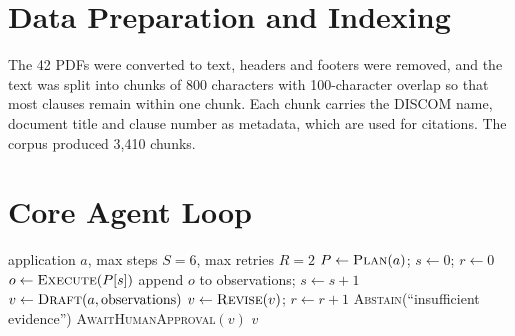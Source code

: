 \documentclass[12pt,a4paper,oneside]{report}
\newif\ifguidance
\newcommand{\guide}[1]{%
  \ifguidance
  \begin{tcolorbox}[enhanced,breakable,colback=guidebg,colframe=bmsblue,
    boxrule=0.6pt,arc=2pt,left=6pt,right=6pt,top=4pt,bottom=4pt,
    fonttitle=\bfseries\small,title={What to write here},
    before upper={\small\setstretch{1.1}}]
  #1
  \end{tcolorbox}
  \fi}
\newcommand{\dodont}[2]{%
  \ifguidance
  \begin{tcolorbox}[enhanced,breakable,sidebyside,sidebyside align=top seam,
    colback=dobg,colbacklower=dontbg,colframe=gray!60,boxrule=0.5pt,arc=2pt,
    lefthand ratio=0.5,left=5pt,right=5pt,top=4pt,bottom=4pt,
    fontupper=\small\setstretch{1.05},fontlower=\small\setstretch{1.05}]
  \textbf{\textcolor{ForestGreen}{\checkmark\ Do}}
  \begin{itemize}[leftmargin=12pt,itemsep=1pt,topsep=2pt]#1\end{itemize}
  \tcblower
  \textbf{\textcolor{BrickRed}{$\times$ Don't}}
  \begin{itemize}[leftmargin=12pt,itemsep=1pt,topsep=2pt]#2\end{itemize}
  \end{tcolorbox}
  \fi}
\newenvironment{sample}
  {\par\noindent{\footnotesize\bfseries\textcolor{BrickRed}{[SAMPLE --- replace with your own content]}}\par\color{samplecol}}
  {\par\medskip}
\begin{document}
\section{Data Preparation and Indexing}
\guide{Explain how raw data was cleaned, chunked, embedded and stored. State chunk size, overlap and
the embedding model, and justify these choices.}
\dodont{\item Give the exact parameters used.
\item Justify the chunk size.
}
{\item Do not say ``the data was preprocessed'' without detail.
}

\begin{sample}
The 42 PDFs were converted to text, headers and footers were removed, and the text was split into
chunks of 800 characters with 100-character overlap so that most clauses remain within one chunk. Each
chunk carries the DISCOM name, document title and clause number as metadata, which are used for
citations. The corpus produced 3{,}410 chunks.
\end{sample}


\section{Core Agent Loop}
\guide{Present the main loop as pseudocode (not raw code). Show where the loop is bounded.}
\dodont{\item Use the algorithm environment.
\item Explain the pseudocode line by line in text.
}
{\item Do not paste long blocks of source code.
}

\begin{sample}
\begin{algorithm}[H]
\caption{SolarScreen agent loop (sample)}
\label{alg:loop}
\begin{algorithmic}[1]
\Require application $a$, max steps $S=6$, max retries $R=2$
\State $P \gets \textsc{Plan}(a)$; \quad $s \gets 0$; \quad $r \gets 0$
  \State $o \gets \textsc{Execute}(P[s])$ 
  \State append $o$ to observations; $s \gets s+1$
\EndWhile
\State $v \gets \textsc{Draft}(a,\text{observations})$
  \State $v \gets \textsc{Revise}(v)$; $r \gets r+1$
\EndWhile
{} \State \Return \textsc{Abstain}(``insufficient evidence'') \EndIf
{} \State \textsc{AwaitHumanApproval}$(v)$ \EndIf
\State \Return $v$
\end{algorithmic}
\end{algorithm}
\end{sample}
\end{document}
